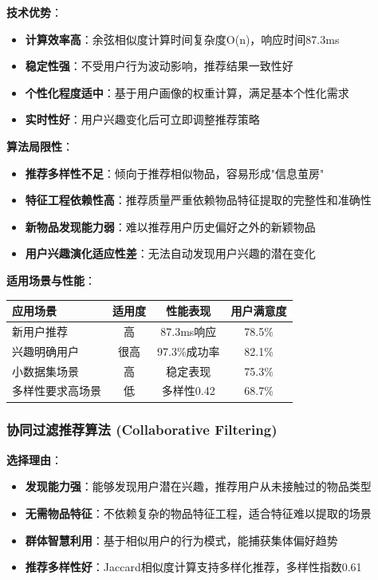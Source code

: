 \documentclass[12pt,a4paper]{article}
\begin{document}
\textbf{技术优势}：
\begin{itemize}
    \item \textbf{计算效率高}：余弦相似度计算时间复杂度O(n)，响应时间87.3ms
    \item \textbf{稳定性强}：不受用户行为波动影响，推荐结果一致性好
    \item \textbf{个性化程度适中}：基于用户画像的权重计算，满足基本个性化需求
    \item \textbf{实时性好}：用户兴趣变化后可立即调整推荐策略
\end{itemize}

\textbf{算法局限性}：
\begin{itemize}
    \item \textbf{推荐多样性不足}：倾向于推荐相似物品，容易形成"信息茧房"
    \item \textbf{特征工程依赖性高}：推荐质量严重依赖物品特征提取的完整性和准确性
    \item \textbf{新物品发现能力弱}：难以推荐用户历史偏好之外的新颖物品
    \item \textbf{用户兴趣演化适应性差}：无法自动发现用户兴趣的潜在变化
\end{itemize}

\textbf{适用场景与性能}：
\begin{center}
\begin{tabular}{|l|c|c|c|}
\hline
\textbf{应用场景} & \textbf{适用度} & \textbf{性能表现} & \textbf{用户满意度} \\
\hline
新用户推荐 & 高 & 87.3ms响应 & 78.5\% \\
兴趣明确用户 & 很高 & 97.3\%成功率 & 82.1\% \\
小数据集场景 & 高 & 稳定表现 & 75.3\% \\
多样性要求高场景 & 低 & 多样性0.42 & 68.7\% \\
\hline
\end{tabular}
\end{center}

\subsubsection{协同过滤推荐算法 (Collaborative Filtering)}
\textbf{选择理由}：
\begin{itemize}
    \item \textbf{发现能力强}：能够发现用户潜在兴趣，推荐用户从未接触过的物品类型
    \item \textbf{无需物品特征}：不依赖复杂的物品特征工程，适合特征难以提取的场景
    \item \textbf{群体智慧利用}：基于相似用户的行为模式，能捕获集体偏好趋势
    \item \textbf{推荐多样性好}：Jaccard相似度计算支持多样化推荐，多样性指数0.61
\end{itemize}
\end{document}
